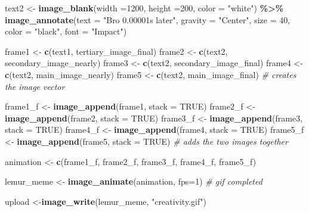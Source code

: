 \documentclass[
]{article}
\newenvironment{Shaded}{\begin{snugshade}}{\end{snugshade}}
\newcommand{\AttributeTok}[1]{\textcolor[rgb]{0.13,0.29,0.53}{#1}}
\newcommand{\CommentTok}[1]{\textcolor[rgb]{0.56,0.35,0.01}{\textit{#1}}}
\newcommand{\ConstantTok}[1]{\textcolor[rgb]{0.56,0.35,0.01}{#1}}
\newcommand{\DecValTok}[1]{\textcolor[rgb]{0.00,0.00,0.81}{#1}}
\newcommand{\FunctionTok}[1]{\textcolor[rgb]{0.13,0.29,0.53}{\textbf{#1}}}
\newcommand{\NormalTok}[1]{#1}
\newcommand{\OtherTok}[1]{\textcolor[rgb]{0.56,0.35,0.01}{#1}}
\newcommand{\SpecialCharTok}[1]{\textcolor[rgb]{0.81,0.36,0.00}{\textbf{#1}}}
\newcommand{\StringTok}[1]{\textcolor[rgb]{0.31,0.60,0.02}{#1}}
\begin{document}
\begin{Shaded}
\begin{Highlighting}[]
\NormalTok{text2 }\OtherTok{\textless{}{-}} \FunctionTok{image\_blank}\NormalTok{(}\AttributeTok{width =}\DecValTok{1200}\NormalTok{,}
                     \AttributeTok{height =}\DecValTok{200}\NormalTok{, }
                     \AttributeTok{color =} \StringTok{"white"}\NormalTok{) }\SpecialCharTok{\%\textgreater{}\%}
  \FunctionTok{image\_annotate}\NormalTok{(}\AttributeTok{text =} \StringTok{"Bro 0.00001s later"}\NormalTok{,}
                 \AttributeTok{gravity =} \StringTok{"Center"}\NormalTok{, }
                 \AttributeTok{size =} \DecValTok{40}\NormalTok{,}
                 \AttributeTok{color =} \StringTok{"black"}\NormalTok{,}
                 \AttributeTok{font =} \StringTok{"Impact"}\NormalTok{)}

\NormalTok{frame1 }\OtherTok{\textless{}{-}} \FunctionTok{c}\NormalTok{(text1, tertiary\_image\_final)}
\NormalTok{frame2 }\OtherTok{\textless{}{-}} \FunctionTok{c}\NormalTok{(text2, secondary\_image\_nearly)}
\NormalTok{frame3 }\OtherTok{\textless{}{-}} \FunctionTok{c}\NormalTok{(text2, secondary\_image\_final)}
\NormalTok{frame4 }\OtherTok{\textless{}{-}} \FunctionTok{c}\NormalTok{(text2, main\_image\_nearly)}
\NormalTok{frame5 }\OtherTok{\textless{}{-}} \FunctionTok{c}\NormalTok{(text2, main\_image\_final) }\CommentTok{\# creates the image vector}

\NormalTok{frame1\_f }\OtherTok{\textless{}{-}} \FunctionTok{image\_append}\NormalTok{(frame1, }\AttributeTok{stack =} \ConstantTok{TRUE}\NormalTok{)}
\NormalTok{frame2\_f }\OtherTok{\textless{}{-}} \FunctionTok{image\_append}\NormalTok{(frame2, }\AttributeTok{stack =} \ConstantTok{TRUE}\NormalTok{)}
\NormalTok{frame3\_f }\OtherTok{\textless{}{-}} \FunctionTok{image\_append}\NormalTok{(frame3, }\AttributeTok{stack =} \ConstantTok{TRUE}\NormalTok{)}
\NormalTok{frame4\_f }\OtherTok{\textless{}{-}} \FunctionTok{image\_append}\NormalTok{(frame4, }\AttributeTok{stack =} \ConstantTok{TRUE}\NormalTok{)}
\NormalTok{frame5\_f }\OtherTok{\textless{}{-}} \FunctionTok{image\_append}\NormalTok{(frame5, }\AttributeTok{stack =} \ConstantTok{TRUE}\NormalTok{) }\CommentTok{\# adds the two images together}

\NormalTok{animation }\OtherTok{\textless{}{-}} \FunctionTok{c}\NormalTok{(frame1\_f, frame2\_f, frame3\_f, frame4\_f, frame5\_f)}

\NormalTok{lemur\_meme }\OtherTok{\textless{}{-}} \FunctionTok{image\_animate}\NormalTok{(animation, }\AttributeTok{fps=}\DecValTok{1}\NormalTok{) }\CommentTok{\# gif completed}

\NormalTok{upload }\OtherTok{\textless{}{-}}\FunctionTok{image\_write}\NormalTok{(lemur\_meme, }\StringTok{"creativity.gif"}\NormalTok{)}
\end{Highlighting}
\end{Shaded}
\end{document}
